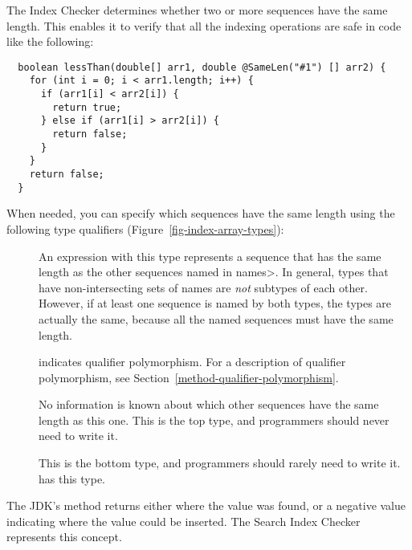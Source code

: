 
The Index Checker determines whether two or more sequences have the same length.
This enables it to verify that all the indexing operations are safe in code
like the following:

\begin{Verbatim}
  boolean lessThan(double[] arr1, double @SameLen("#1") [] arr2) {
    for (int i = 0; i < arr1.length; i++) {
      if (arr1[i] < arr2[i]) {
        return true;
      } else if (arr1[i] > arr2[i]) {
        return false;
      }
    }
    return false;
  }
\end{Verbatim}

When needed, you can specify which sequences have the same length using the following type qualifiers (Figure~\ref{fig-index-array-types}):

\begin{description}
\item[]
  An expression with this type represents a sequence that has the
  same length as the other sequences named in \<names>. In general,
   types that have non-intersecting sets of names
  are \textit{not} subtypes of each other. However, if at least one
  sequence is named by both types, the types are actually the same,
  because all the named sequences must have the same length.
\item[]
  indicates qualifier polymorphism.
  For a description of qualifier polymorphism, see
  Section~\ref{method-qualifier-polymorphism}.
\item[]
  No information is known about which other sequences have the same length
  as this one.
  This is the top type, and programmers should never need to write it.
\item[]
  This is the bottom type, and programmers should rarely need to write it.
   has this type.
\end{description}



The JDK's
method returns either where the value was found, or a negative value
indicating where the value could be inserted.  The Search Index Checker
represents this concept.

